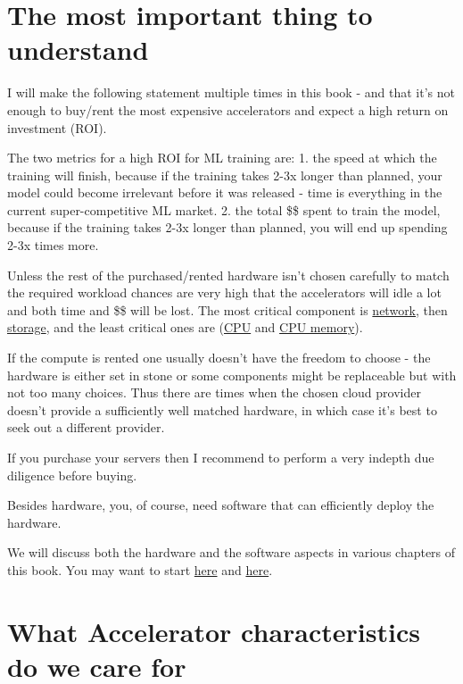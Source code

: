 \documentclass[
]{report}
\begin{document}
\section{The most important thing to
understand}\label{the-most-important-thing-to-understand}

I will make the following statement multiple times in this book - and
that it's not enough to buy/rent the most expensive accelerators and
expect a high return on investment (ROI).

The two metrics for a high ROI for ML training are: 1. the speed at
which the training will finish, because if the training takes 2-3x
longer than planned, your model could become irrelevant before it was
released - time is everything in the current super-competitive ML
market. 2. the total \$\$ spent to train the model, because if the
training takes 2-3x longer than planned, you will end up spending 2-3x
times more.

Unless the rest of the purchased/rented hardware isn't chosen carefully
to match the required workload chances are very high that the
accelerators will idle a lot and both time and \$\$ will be lost. The
most critical component is \href{../../network}{network}, then
\href{../../storage/}{storage}, and the least critical ones are
(\href{../cpu}{CPU} and \href{../cpu-memory}{CPU memory}).

If the compute is rented one usually doesn't have the freedom to choose
- the hardware is either set in stone or some components might be
replaceable but with not too many choices. Thus there are times when the
chosen cloud provider doesn't provide a sufficiently well matched
hardware, in which case it's best to seek out a different provider.

If you purchase your servers then I recommend to perform a very indepth
due diligence before buying.

Besides hardware, you, of course, need software that can efficiently
deploy the hardware.

We will discuss both the hardware and the software aspects in various
chapters of this book. You may want to start
\href{../../training/performance}{here} and
\href{../../training/model-parallelism}{here}.

\section{What Accelerator characteristics do we care
for}\label{what-accelerator-characteristics-do-we-care-for}
\end{document}
